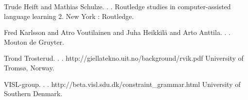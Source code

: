 \documentclass[11pt]{article}
\begin{document}
\begin{thebibliography}{}
{Trude Heift and Mathias Schulze}.
.
.
\newblock Routledge studies in computer-assisted language learning 2. 
\newblock New York : Routledge.

{Fred Karlsson and Atro Voutilainen and Juha Heikkilä and Arto Anttila}.
.
.
\newblock Mouton de Gruyter.




{Trond Trosterud}.
.
.
\newblock http://giellatekno.uit.no/background/rvik.pdf
\newblock University of Tromsø, Norway.

{VISL-group}.
.
.
\newblock http://beta.visl.sdu.dk/constraint\_grammar.html
\newblock University of Southern Denmark.


\end{thebibliography}


%
%



	
\end{document}
